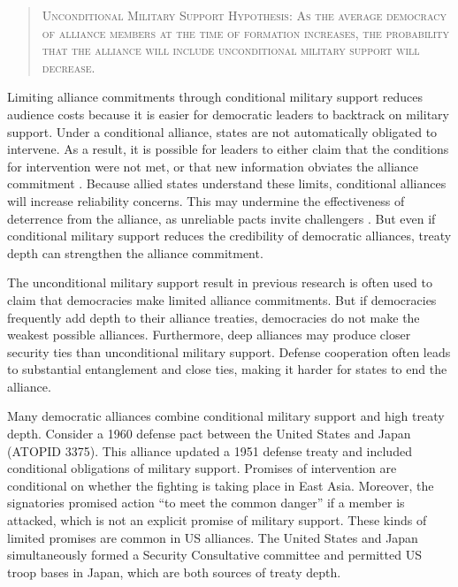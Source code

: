 \documentclass[12pt]{article}
\begin{document}
\begin{quote}
\textsc{Unconditional Military Support Hypothesis: As the average democracy of alliance members at the time of formation increases, the probability that the alliance will include unconditional military support will decrease.}
\end{quote} 


Limiting alliance commitments through conditional military support reduces audience costs because it is easier for democratic leaders to backtrack on military support. 
Under a conditional alliance, states are not automatically obligated to intervene. 
As a result, it is possible for leaders to either claim that the conditions for intervention were not met, or that new information obviates the alliance commitment \citep{LevenduskyHorowitz2012}. 
Because allied states understand these limits, conditional alliances will increase reliability concerns. 
This may undermine the effectiveness of deterrence from the alliance, as unreliable pacts invite challengers \citep{Smith1995}. 
But even if conditional military support reduces the credibility of democratic alliances, treaty depth can strengthen the alliance commitment. 


The unconditional military support result in previous research is often used to claim that democracies make limited alliance commitments. 
But if democracies frequently add depth to their alliance treaties, democracies do not make the weakest possible alliances. 
Furthermore, deep alliances may produce closer security ties than unconditional military support. 
Defense cooperation often leads to substantial entanglement and close ties, making it harder for states to end the alliance. 


Many democratic alliances combine conditional military support and high treaty depth. 
Consider a 1960 defense pact between the United States and Japan (ATOPID 3375).
This alliance updated a 1951 defense treaty and included conditional obligations of military support. 
Promises of intervention are conditional on whether the fighting is taking place in East Asia. 
Moreover, the signatories promised action ``to meet the common danger'' if a member is attacked, which is not an explicit promise of military support. 
These kinds of limited promises are common in US alliances. 
The United States and Japan simultaneously formed a Security Consultative committee and permitted US troop bases in Japan, which are both sources of treaty depth. 
\end{document}
